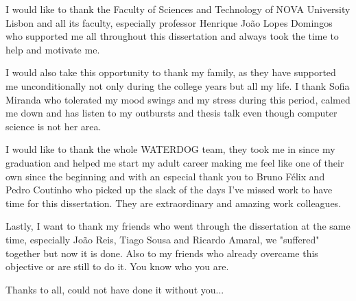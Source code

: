 \acknowledgements

I would like to thank the Faculty of Sciences and Technology of NOVA University Lisbon and all its faculty, especially professor Henrique João Lopes Domingos who supported me all throughout this dissertation and always took the time to help and motivate me. 

I would also take this opportunity to thank my family, as they have supported me unconditionally not only during the college years but all my life. I thank Sofia Miranda who tolerated my mood swings and my stress during this period, calmed me down and has listen to my outbursts and thesis talk even though computer science is not her area.

I would like to thank the whole WATERDOG team, they took me in since my graduation and helped me start my adult career making me feel like one of their own since the beginning and with an  especial thank you to Bruno Félix and Pedro Coutinho who picked up the slack of the days I've missed work to have time for this dissertation. They are extraordinary and amazing work colleagues.

Lastly, I want to thank my friends who went through the dissertation at the same time, especially João Reis, Tiago Sousa and Ricardo Amaral, we "suffered" together but now it is done. Also to my friends who already overcame this objective or are still to do it. You know who you are.

\vspace{20mm}

Thanks to all, could not have done it without you...